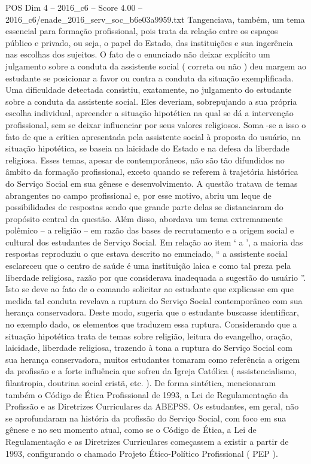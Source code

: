 \begin{textsample}{POS Dim 4 – 2016\_c6 – Score 4.00 – 2016\_c6/enade\_2016\_serv\_soc\_b6e03a9959.txt}
Tangenciava, também, um tema essencial para formação profissional, pois trata da relação entre os espaços público e privado, ou seja, o papel do Estado, das instituições e sua ingerência nas escolhas dos sujeitos.
O fato de o enunciado não deixar explícito um julgamento sobre a conduta da assistente social ( correta ou não ) deu margem ao estudante se posicionar a favor ou contra a conduta da situação exemplificada.
Uma dificuldade detectada consistiu, exatamente, no julgamento do estudante sobre a conduta da assistente social.
Eles deveriam, sobrepujando a sua própria escolha individual, apreender a situação hipotética na qual se dá a intervenção profissional, sem se deixar influenciar por seus valores religiosos.
Soma -se a isso o fato de que a crítica apresentada pela assistente social à proposta do usuário, na situação hipotética, se baseia na laicidade do Estado e na defesa da liberdade religiosa.
Esses temas, apesar de contemporâneos, não são tão difundidos no âmbito da formação profissional, exceto quando se referem à trajetória histórica do Serviço Social em sua gênese e desenvolvimento.
A questão tratava de temas abrangentes no campo profissional e, por esse motivo, abriu um leque de possibilidades de respostas sendo que grande parte delas se distanciaram do propósito central da questão.
Além disso, abordava um tema extremamente polêmico – a religião – em razão das bases de recrutamento e a origem social e cultural dos estudantes de Serviço Social.
Em relação ao item ‘ a ’, a maioria das respostas reproduziu o que estava descrito no enunciado, “ a assistente social esclareceu que o centro de saúde é uma instituição laica e como tal preza pela liberdade religiosa, razão por que considerava inadequada a sugestão do usuário ”.
Isto se deve ao fato de o comando solicitar ao estudante que explicasse em que medida tal conduta revelava a ruptura do Serviço Social contemporâneo com sua herança conservadora.
Deste modo, sugeria que o estudante buscasse identificar, no exemplo dado, os elementos que traduzem essa ruptura.
Considerando que a situação hipotética trata de temas sobre religião, leitura do evangelho, oração, laicidade, liberdade religiosa, trazendo à tona a ruptura do Serviço Social com sua herança conservadora, muitos estudantes tomaram como referência a origem da profissão e a forte influência que sofreu da Igreja Católica ( assistencialismo, filantropia, doutrina social cristã, etc. ).
De forma sintética, mencionaram também o Código de Ética Profissional de 1993, a Lei de Regulamentação da Profissão e as Diretrizes Curriculares da ABEPSS.
Os estudantes, em geral, não se aprofundaram na história da profissão do Serviço Social, com foco em sua gênese e no seu momento atual, como se o Código de Ética, a Lei de Regulamentação e as Diretrizes Curriculares começassem a existir a partir de 1993, configurando o chamado Projeto Ético-Político Profissional ( PEP ).

\end{textsample}
